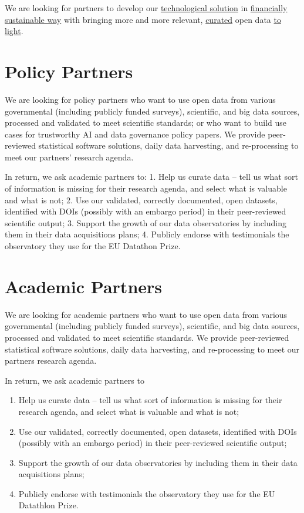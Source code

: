 \documentclass[
  a4paper,
  openany, a4paper, oneside]{book}
\providecommand{\tightlist}{%
  \setlength{\itemsep}{0pt}\setlength{\parskip}{0pt}}
\begin{document}
We are looking for partners to develop our \protect\hyperlink{app}{technological solution} in \href{service}{financially sustainable way} with bringing more and more relevant, \protect\hyperlink{data-curators}{curated} open data \protect\hyperlink{open-data}{to light}.

\hypertarget{policy-partners}{%
\section{Policy Partners}\label{policy-partners}}

We are looking for policy partners who want to use open data from various governmental (including publicly funded surveys), scientific, and big data sources, processed and validated to meet scientific standards; or who want to build use cases for trustworthy AI and data governance policy papers. We provide peer-reviewed statistical software solutions, daily data harvesting, and re-processing to meet our partners' research agenda.

In return, we ask academic partners to:
1. Help us curate data -- tell us what sort of information is missing for their research agenda, and select what is valuable and what is not;
2. Use our validated, correctly documented, open datasets, identified with DOIs (possibly with an embargo period) in their peer-reviewed scientific output;
3. Support the growth of our data observatories by including them in their data acquisitions plans;
4. Publicly endorse with testimonials the observatory they use for the EU Datathon Prize.

\hypertarget{academic-partners}{%
\section{Academic Partners}\label{academic-partners}}

We are looking for academic partners who want to use open data from various governmental (including publicly funded surveys), scientific, and big data sources, processed and validated to meet scientific standards. We provide peer-reviewed statistical software solutions, daily data harvesting, and re-processing to meet our partners research agenda.

In return, we ask academic partners to

\begin{enumerate}
\def\labelenumi{\arabic{enumi}.}
\tightlist
\item
  Help us curate data -- tell us what sort of information is missing for their research agenda, and select what is valuable and what is not;
\item
  Use our validated, correctly documented, open datasets, identified with DOIs (possibly with an embargo period) in their peer-reviewed scientific output;
\item
  Support the growth of our data observatories by including them in their data acquisitions plans;
\item
  Publicly endorse with testimonials the observatory they use for the EU Datathlon Prize.
\end{enumerate}
\end{document}
